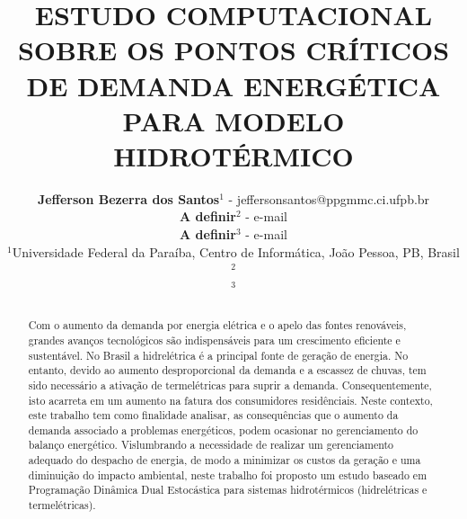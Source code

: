 \documentclass[12pt,fleqn]{article}
\title{ESTUDO COMPUTACIONAL SOBRE OS PONTOS CR\'ITICOS DE DEMANDA ENERG\'ETICA PARA  MODELO HIDROT\'ERMICO}%
\author
    {\rm \begin{tabular}{l} 
    \textbf{Jefferson Bezerra dos Santos}$^{1}$ - {\textnormal jeffersonsantos@ppgmmc.ci.ufpb.br}\\%
    \textbf{A definir}$^{2}$ - {\textnormal e-mail}\\
    \textbf{A definir}$^{3}$ - {\textnormal e-mail}\\
    {\fontsize{11}{0}\selectfont $^{1}$Universidade Federal da Para\'iba, Centro de Inform\'atica, Jo\~ao Pessoa,
  PB, Brasil}\vspace*{-0.05cm} \\
    {\fontsize{11}{0}\selectfont $^{2}$}\vspace*{-0.05cm}\\
    {\fontsize{11}{0}\selectfont $^{3}$}
  \end{tabular}}
\renewcommand{\headrulewidth}{0.0pt}
\begin{document}
\maketitle
\thispagestyle{firspagetstyle}

\renewcommand{\headrulewidth}{0.0pt}
\rhead{}

\begin{abstract}
  Com o aumento da demanda por energia el\'etrica e o apelo das fontes renov\'aveis, grandes avan\c cos tecnol\'ogicos
  s\~ao indispens\'aveis para um crescimento eficiente e sustent\'avel. No Brasil a hidrel\'etrica \'e a principal fonte de gera\c c\~ao de energia. No entanto, devido ao aumento desproporcional da demanda e a escassez de chuvas, tem sido necess\'ario a ativa\c c\~ao de termel\'etricas para suprir a demanda. Consequentemente, isto acarreta em um aumento na fatura
  dos consumidores resid\^enciais. Neste contexto, este trabalho tem como finalidade analisar, as consequ\^encias que o aumento da demanda
  associado a problemas energ\'eticos, podem ocasionar no gerenciamento do balan\c co energ\'etico. Vislumbrando a necessidade de realizar um gerenciamento adequado do despacho de energia, de modo a minimizar os custos da gera\c
  c\~ao e uma diminui\c c\~ao do impacto ambiental, neste trabalho foi proposto um estudo baseado em Programa\c c\~ao
  Din\^amica Dual Estoc\'astica para sistemas hidrot\'ermicos (hidrel\'etricas e termel\'etricas).
\end{abstract}

\pagestyle{fancy}
\end{document}

